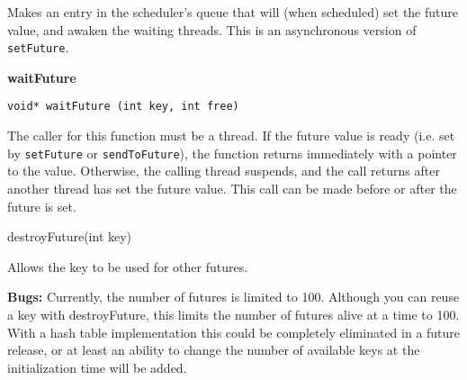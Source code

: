Makes an entry in the scheduler's queue that will (when scheduled) set
the future value, and awaken the waiting threads. This is an
asynchronous version of \verb#setFuture#. 


{\large \bf  waitFuture}

\verb#void* waitFuture (int key, int free)#

The caller for this function must be a thread. If the future value is
ready (i.e. set by \verb#setFuture# or \verb#sendToFuture#), the
function returns immediately with a pointer to the value. Otherwise,
the calling thread suspends, and the call returns after another thread
has set the future value. This call can be made before or after the future
is set.

destroyFuture(int key)

Allows  the key to be used for other futures.

{\large \bf Bugs:} Currently, the number of futures is limited to 100.
Although you can reuse a key with destroyFuture, this limits the
number of futures alive at a time to 100. With a hash table
implementation this could be completely eliminated in a future
release, or at least an ability to change the number of available keys
at the initialization time will be added.



